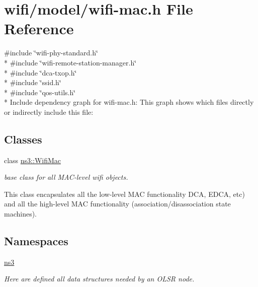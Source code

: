 \hypertarget{wifi-mac_8h}{}\section{wifi/model/wifi-\/mac.h File Reference}
\label{wifi-mac_8h}
{\ttfamily \#include \char`\"{}wifi-\/phy-\/standard.\+h\char`\"{}}\\*
{\ttfamily \#include \char`\"{}wifi-\/remote-\/station-\/manager.\+h\char`\"{}}\\*
{\ttfamily \#include \char`\"{}dca-\/txop.\+h\char`\"{}}\\*
{\ttfamily \#include \char`\"{}ssid.\+h\char`\"{}}\\*
{\ttfamily \#include \char`\"{}qos-\/utils.\+h\char`\"{}}\\*
Include dependency graph for wifi-\/mac.h\+:
This graph shows which files directly or indirectly include this file\+:
\subsection*{Classes}
\begin{DoxyCompactItemize}
\item 
class \hyperlink{classns3_1_1WifiMac}{ns3\+::\+Wifi\+Mac}
\begin{DoxyCompactList}\small\item\em base class for all M\+A\+C-\/level wifi objects.

This class encapsulates all the low-\/level M\+AC functionality D\+CA, E\+D\+CA, etc) and all the high-\/level M\+AC functionality (association/disassociation state machines). \end{DoxyCompactList}\end{DoxyCompactItemize}
\subsection*{Namespaces}
\begin{DoxyCompactItemize}
\item 
 \hyperlink{namespacens3}{ns3}
\begin{DoxyCompactList}\small\item\em Here are defined all data structures needed by an O\+L\+SR node. \end{DoxyCompactList}\end{DoxyCompactItemize}
